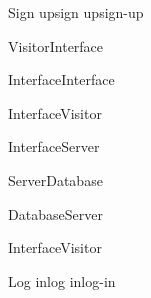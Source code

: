 \begin{sdfig}{Sign up}{sign up}{sign-up}
\begin{umlcall}[op={Sign up}]{Visitor}{Interface}
\begin{umlcall}[op={Validate}]{Interface}{Interface}
\begin{umlfragment}[type=alt, label=valid]
\begin{umlcall}[type=return,op={Loading}]{Interface}{Visitor}
\begin{umlcall}[op={Sign up}]{Interface}{Server}
\begin{umlcall}[op={Has user}]{Server}{Database}
\begin{umlfragment}[type=alt, label=true]
\begin{umlcall}[type=return,op={No}]{Database}{Server}
                \end{umlcall}
              \end{umlfragment}
            \end{umlcall}
          \end{umlcall}
        \end{umlcall}
        \umlfpart[else]
        \begin{umlcall}[type=return,op={Error}]{Interface}{Visitor}
        \end{umlcall}
      \end{umlfragment}
    \end{umlcall}
  \end{umlcall}
\end{sdfig}
\begin{toexclude}


\begin{sdfig}{Log in}{log in}{log-in}


\end{sdfig}
\end{toexclude}
